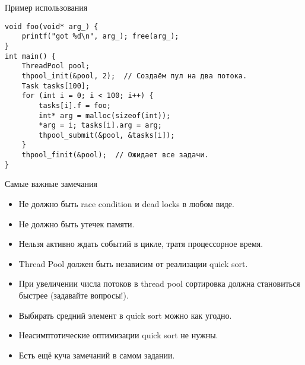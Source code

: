 \begin{frame}[fragile]{Пример использования}
\begin{verbatim}
void foo(void* arg_) {
    printf("got %d\n", arg_); free(arg_);
}
int main() {
    ThreadPool pool;
    thpool_init(&pool, 2);  // Создаём пул на два потока.
    Task tasks[100];
    for (int i = 0; i < 100; i++) {
        tasks[i].f = foo;
        int* arg = malloc(sizeof(int));
        *arg = i; tasks[i].arg = arg;
        thpool_submit(&pool, &tasks[i]);
    }
    thpool_finit(&pool);  // Ожидает все задачи.
}
\end{verbatim}
\end{frame}

\begin{frame}{Самые важные замечания}
	\begin{itemize}
		\item Не должно быть race condition и dead locks в любом виде.
		\item Не должно быть утечек памяти.
		\item Нельзя активно ждать событий в цикле, тратя процессорное время.
		\item Thread Pool должен быть независим от реализации quick sort.
		\item При увеличении числа потоков в thread pool сортировка должна становиться быстрее (задавайте вопросы!).
		\item Выбирать средний элемент в quick sort можно как угодно.
		\item Неасимптотические оптимизации quick sort не нужны.
		\item Есть ещё куча замечаний в самом задании.
	\end{itemize}
\end{frame}
